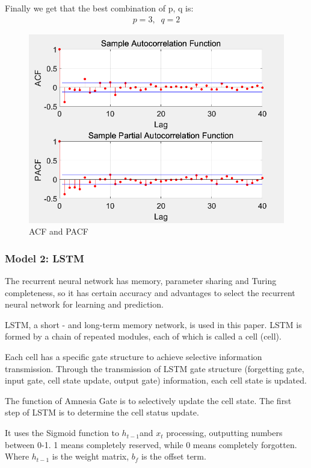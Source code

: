 \documentclass{apmcmthesis}
\begin{document}
  Finally we get that the best combination of p, q is:
  \begin{align*}
    p=3,\;\;q=2
  \end{align*}

  \begin{figure}[htbp]
    \centering
    \includegraphics[scale=0.4]{ACF.png}
    \caption{ACF and PACF}
  \end{figure}
  
  \subsubsection{Model 2: LSTM}
  
  The recurrent neural network has memory, parameter sharing and Turing completeness, so it has certain accuracy and advantages to select the recurrent neural network for learning and prediction.
  
  LSTM, a short - and long-term memory network, is used in this paper. LSTM is formed by a chain of repeated modules, each of which is called a cell (cell).
  
  Each cell has a specific gate structure to achieve selective information transmission. Through the transmission of LSTM gate structure (forgetting gate, input gate, cell state update, output gate) information, each cell state is updated.
  
  The function of Amnesia Gate is to selectively update the cell state. The first step of LSTM is to determine the cell status update.
  
  It uses the Sigmoid function to $h_{t-1} $and $x_t $ processing, outputting numbers between 0-1. 
  1 means completely reserved, while 0 means completely forgotten. Where $h_{t-1} $ is the weight matrix, $b_f$ is the offset term.
  
\end{document}
